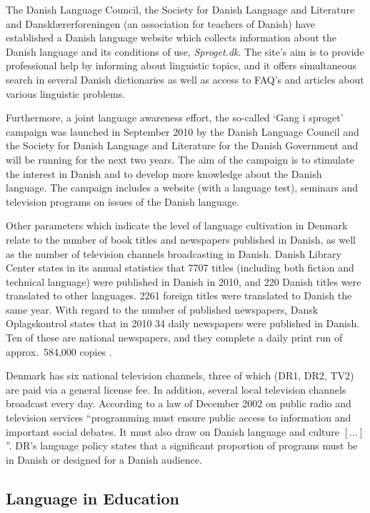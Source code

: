 \begin{multicols}{2}
The Danish Language Council, the Society for Danish Language and Literature and Dansk\-l\ae rerforeningen (an association for teachers of Danish) have established a Danish language website which collects information about the Danish language and its conditions of use, {\it Sproget.dk}. The site's aim is to provide professional help by informing about linguistic topics, and it offers simultaneous search in several Danish dictionaries as well as access to FAQ's and articles about various linguistic problems. 

Furthermore, a joint language awareness effort, the so-called `Gang i sproget' campaign was launched in September 2010 by the Danish Language Council and the Society for Danish Language and Literature for the Danish Government and will be running for the next two years. The aim of the campaign is to stimulate the interest in Danish and to develop more knowledge about the Danish language. The campaign includes a website (with a language test), seminars and television programs on issues of the Danish language. 

Other parameters which indicate the level of language cultivation in Denmark relate to the number of book titles and newspapers published in Danish, as well as the number of television channels broadcasting in Danish. Danish Library Center states in its annual statistics that 7707 titles (including both fiction and technical language) were published in Danish in 2010, and 220 Danish titles were translated to other languages. 2261 foreign titles were translated to Danish the same year. With regard to the number of published newspapers, Dansk Oplagskontrol states that in 2010 34 daily newspapers were published in Danish. Ten of these are national newspapers, and they complete a daily print run of approx.\ 584,000 copies \cite{ddo}. 

Denmark has six national television channels, three of which (DR1, DR2, TV2) are paid via a general license fee. In addition, several local television channels broadcast every day. According to a law of December 2002 on public radio and television services ``programming must ensure public access to information and important social debates. It must also draw on Danish language and culture $[...]$''. DR's language policy states that a significant proportion of programs must be in Danish or designed for a Danish audience. 


\subsection{Language in Education}


\end{multicols}
